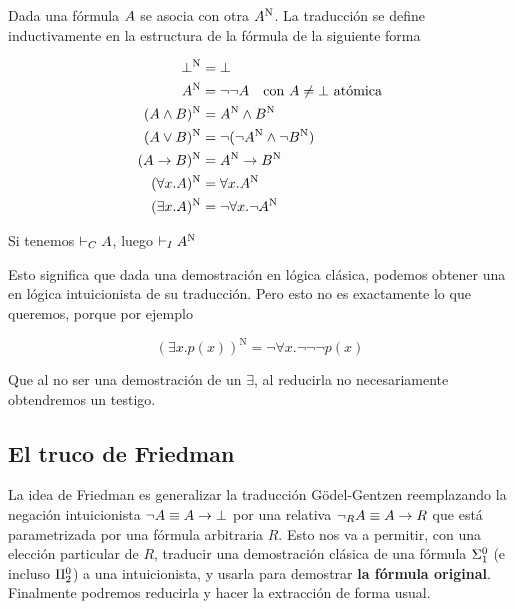 \newcommand{\gN}[1]{#1^{\text{N}}}

\begin{definition} Dada una fórmula $A$ se asocia con otra $\gN{\form}$. La
    traducción se define inductivamente en la estructura de la fórmula de la
    siguiente forma

    \begin{align*}
        \gN{\bot} &= \bot\\
        \gN{\form} &= \neg\neg \form \quad \text{con $\form \neq \bot$ atómica}\\
        \gN{(\form \wedge \formTwo)} &= \gN{\form} \wedge \gN{\formTwo}\\
        \gN{(\form \vee \formTwo)} &= \neg(\neg\gN{\form} \wedge \neg\gN{\formTwo})\\
        \gN{(\form \rightarrow \formTwo)} &= \gN{\form} \rightarrow \gN{\formTwo}\\
        \gN{(\forall \var . \form)} &= \forall \var . \gN{\form}\\
        \gN{(\exists \var . \form)} &= \neg \forall \var . \neg \gN{\form}
    \end{align*}
\end{definition}

\begin{theorem}
    Si tenemos $\vdash_C A$, luego $\judgI \gN{\form}$
\end{theorem}

Esto significa que dada una demostración en lógica clásica, podemos obtener una
en lógica intuicionista de su traducción. Pero esto no es exactamente lo que
queremos, porque por ejemplo

\[
    \gN{(\exists x. p(x))} = \neg \forall x . \neg\neg\neg p(x)
\]

Que al no ser una demostración de un $\exists$, al reducirla no necesariamente
obtendremos un testigo.

\subsection{El truco de Friedman}

La idea de Friedman \cite{miquel-friedman} es generalizar la traducción
Gödel-Gentzen reemplazando la negación intuicionista $\neg A \equiv A
\rightarrow \bot$ por una relativa $\neg_R A \equiv A \rightarrow R$ que
está parametrizada por una fórmula arbitraria $R$. Esto nos va a permitir, con
una elección particular de $R$,
traducir una demostración clásica de una fórmula $\Sigma^0_1$ (e incluso
$\Pi^0_2$) a una intuicionista, y usarla para demostrar \textbf{la fórmula
original}. Finalmente podremos reducirla y hacer la extracción de forma usual.

